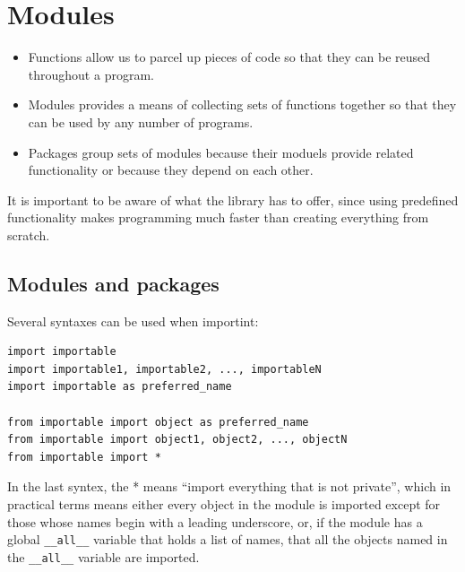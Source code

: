 
\chapter{Modules}

\begin{itemize}
\item Functions allow us to parcel up pieces of code so that they can be reused throughout a program.
\item Modules provides a means of collecting sets of functions together so that they can be used by any number of programs.
\item Packages group sets of modules because their moduels provide related functionality or because they depend on each other.
\end{itemize}


\begin{tcolorbox}
  It is important to be aware of what the library has to offer, since using predefined functionality makes programming much faster than creating everything from scratch.
\end{tcolorbox}


\section{Modules and packages}

Several syntaxes can be used when importint:
\begin{tcolorbox}
\begin{verbatim}
import importable
import importable1, importable2, ..., importableN
import importable as preferred_name

from importable import object as preferred_name
from importable import object1, object2, ..., objectN
from importable import *
\end{verbatim}
\end{tcolorbox}


In the last syntex, the * means ``import everything that is not private'',
which in practical terms means
either every object in the module is imported except for those whose names begin with a leading underscore, or,
if the module has a global \verb|__all__| variable that holds a list of names, that all the objects named in the \verb|__all__| variable are imported.







